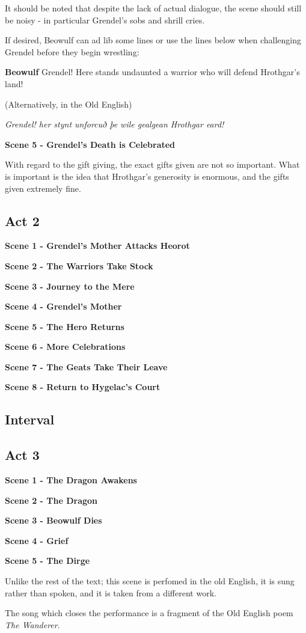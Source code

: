 \documentclass[a4paper]{article}
\begin{document}
{It should be noted that despite the lack of actual dialogue,
the scene should still be noisy - in particular Grendel's sobs 
and shrill cries. 

If desired, Beowulf can ad lib some lines or use the lines below when challenging
Grendel before they begin wrestling:

\textbf{Beowulf} Grendel! Here stands undaunted
 a warrior who will defend Hrothgar's land!

(Alternatively, in the Old English)

\textit{ Grendel! her stynt unforcuð
þe wile gealgean Hrothgar eard!}

\centerline{\textbf{Scene 5 - Grendel's Death is Celebrated}}

With regard to the gift giving, the exact gifts given are not so important.
What is important is the idea that Hrothgar's generosity is enormous, and the gifts
given extremely fine.

\subsection{Act 2}%

\centerline{\textbf{Scene 1 - Grendel's Mother Attacks Heorot}}

\centerline{\textbf{Scene 2 - The Warriors Take Stock}}

\centerline{\textbf{Scene 3 - Journey to the Mere}}

\centerline{\textbf{Scene 4 - Grendel's Mother}}

\centerline{\textbf{Scene 5 - The Hero Returns}}

\centerline{\textbf{Scene 6 - More Celebrations}}

\centerline{\textbf{Scene 7 - The Geats Take Their Leave}}

\centerline{\textbf{Scene 8 - Return to Hygelac's Court}}

\subsection{Interval}%

\subsection{Act 3}%

\centerline{\textbf{Scene 1 - The Dragon Awakens}}

\centerline{\textbf{Scene 2 - The Dragon}}

\centerline{\textbf{Scene 3 - Beowulf Dies}}

\centerline{\textbf{Scene 4 - Grief}}

\centerline{\textbf{Scene 5 - The Dirge}}

Unlike the rest of the text; this scene is perfomed in the old English, it is sung 
rather than spoken, and it is taken from a different work.

The song which closes the performance is a fragment of the Old English poem \textit{The Wanderer}.

}
\end{document}
